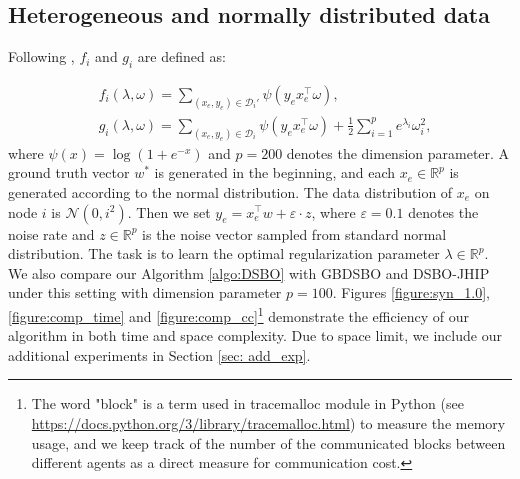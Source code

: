 \documentclass{article}
\theoremstyle{plain}
\theoremstyle{definition}
\theoremstyle{remark}
\newcommand{\R}{\mathbb{R}}
\newcommand{\T}{^{\top}}
\newcommand{\cD}{\mathcal{D}}
\begin{document}
\subsection{Heterogeneous and normally distributed data}\label{sec: syn_exp}
Following \citet{pedregosa2016hyperparameter, grazzi2020iteration, chen2022decentralized}, $f_i$ and $g_i$ are defined as:

\begin{align*}
    &f_i(\lambda, \omega) = \sum_{(x_e,y_e)\in\cD_i'}\psi(y_ex_e^{\top}\omega), \\
    &g_i(\lambda, \omega) = \sum_{(x_e,y_e)\in\cD_i}\psi(y_ex_e^{\top}\omega) + \frac{1}{2}\sum_{i=1}^{p}e^{\lambda_i}\omega_i^2,
\end{align*}
where $\psi(x) = \log(1 + e^{-x})$ and $p=200$ denotes the dimension parameter. A ground truth vector $w^*$ is generated in the beginning, and each $x_e\in\R^p$ is generated according to the normal distribution. The data distribution of $x_e$ on node $i$ is $\mathcal{N}(0, i^2)$. Then we set $y_e = x_e\T w + \varepsilon\cdot z$, where $\varepsilon = 0.1$ denotes the noise rate and $z\in\R^p$ is the noise vector sampled from standard normal distribution. The task is to learn the optimal regularization parameter $\lambda\in\R^p$. We also compare our Algorithm \ref{algo:DSBO} with GBDSBO \citep{yang2022decentralized} and DSBO-JHIP \citep{chen2022decentralized} under this setting with dimension parameter $p=100$. Figures \ref{figure:syn_1.0}, \ref{figure:comp_time} and \ref{figure:comp_cc}\footnote{The word "block" is a term used in tracemalloc module in Python (see \url{https://docs.python.org/3/library/tracemalloc.html}) to measure the memory usage, and we keep track of the number of the communicated blocks between different agents as a direct measure for communication cost.} demonstrate the efficiency of our algorithm in both time and space complexity. Due to space limit, we include our additional experiments in Section \ref{sec: add_exp}.
\end{document}
